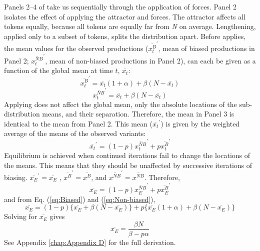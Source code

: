 Panels 2--4 of  take us sequentially through
the application of forces. Panel 2 isolates the effect of applying
the attractor and  forces. The attractor affects all tokens
equally, because all tokens are equally far from \emph{N} on average.
Lengthening, applied only to a subset of tokens, splits the distribution
apart. Before  applies, the mean values for the observed
productions ($\overline{x_{t}^{B}}^{\prime}$, mean of biased productions
in Panel 2; $\overline{x_{t}^{NB}}^{\prime}$, mean of non-biased productions
in Panel 2), can each be given as a function of the global mean at
time $t$, $\overline{x_{t}}$:
\begin{equation}
\overline{x_{t}^{B}}^{\prime}=\overline{x_{t}}(1+\alpha)+\beta(N-\overline{x_{t}})\label{eq:Biased}
\end{equation}
\begin{equation}
\overline{x_{t}^{NB}}^{\prime}=\overline{x_{t}}+\beta(N-\overline{x_{t}})\label{eq:Non-biased}
\end{equation}
Applying  does not affect the global mean, only the absolute
locations of the sub-distribution means, and their separation. Therefore,
the mean in Panel 3 is identical to the mean from Panel 2. This mean
($\overline{x_{t}}^{\prime}$) is given by the weighted average of the
means of the observed  variants: 
\begin{equation}
\overline{x_{t}}^{\prime}=(1-p)\overline{x_{t}^{NB}}^{\prime}+p\overline{x_{t}^{B}}^{\prime}\label{eq: G weighted mean}
\end{equation}
Equilibrium is achieved when continued iterations fail to change the
locations of the means. This means that they should be unaffected
by successive iterations of biasing. $\overline{x_{E}}^{\prime}=\overline{x_{E}}$
, $\overline{x^{B}}^{\prime}=\overline{x^{B}}$, and $\overline{x^{NB}}^{\prime}=\overline{x^{NB}}$.
Therefore, 
\begin{equation}
\overline{x_{E}}=(1-p)\overline{x_{E}^{NB}}^{\prime}+p\overline{x_{E}^{B}}^{\prime}\label{eq:equilbrium 1}
\end{equation}
and from Eq. (\ref{eq:Biased}) and (\ref{eq:Non-biased}), 
\begin{equation}
\overline{x_{E}}=(1-p)\{\overline{x_{E}}+\beta(N-\overline{x_{E}})\}+p\{\overline{x_{E}}(1+\alpha)+\beta(N-\overline{x_{E}})\}\label{eq:equilbrium 2}
\end{equation}
Solving for $\overline{x_{E}}$ gives
\begin{equation}
\overline{x_{E}}=\frac{\beta N}{\beta-p\alpha}\label{eq: lengthening process}
\end{equation}
See Appendix \ref{chap:Appendix D} for the full derivation.

